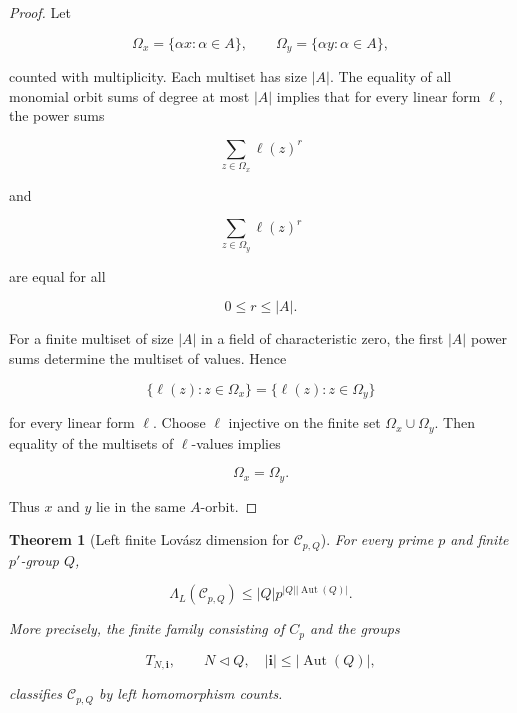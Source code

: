 \documentclass[11pt]{article}
\newtheorem{theorem}{Theorem}[section]
\begin{document}
\begin{proof}
Let

\[
\Omega_x=\{\alpha x:\alpha\in A\},
\qquad
\Omega_y=\{\alpha y:\alpha\in A\},
\]

counted with multiplicity. Each multiset has size $|A|$. The equality of all monomial orbit sums of degree at most $|A|$ implies that for every linear form $\ell$, the power sums

\[
\sum_{z\in\Omega_x}\ell(z)^r
\]

and

\[
\sum_{z\in\Omega_y}\ell(z)^r
\]

are equal for all

\[
0\le r\le |A|.
\]

For a finite multiset of size $|A|$ in a field of characteristic zero, the first $|A|$ power sums determine the multiset of values. Hence

\[
\{\ell(z):z\in\Omega_x\}
=\{\ell(z):z\in\Omega_y\}
\]

for every linear form $\ell$. Choose $\ell$ injective on the finite set $\Omega_x\cup\Omega_y$. Then equality of the multisets of $\ell$-values implies

\[
\Omega_x=\Omega_y.
\]

Thus $x$ and $y$ lie in the same $A$-orbit.

\end{proof}

\begin{theorem}[Left finite Lovász dimension for $\mathcal C_{p,Q}$]
For every prime $p$ and finite $p'$-group $Q$,

\[
\Lambda_L(\mathcal C_{p,Q})
\le
|Q|p^{|Q||\operatorname{Aut}(Q)|}.
\]

More precisely, the finite family consisting of $C_p$ and the groups

\[
T_{N,\mathbf i},
\qquad
N\lhd Q,\quad |\mathbf i|\le|\operatorname{Aut}(Q)|,
\]

classifies $\mathcal C_{p,Q}$ by left homomorphism counts.

\end{theorem}
\end{document}

